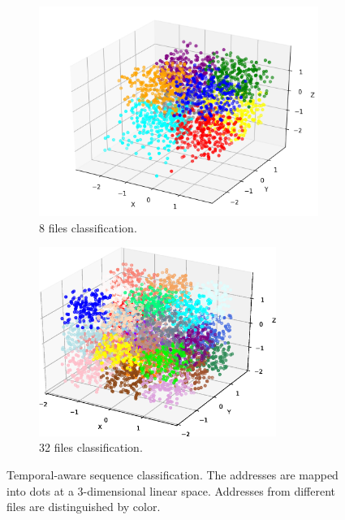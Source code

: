 \begin{figure}[t]
  \centering
  \begin{subfigure}[b]{0.45\textwidth}
    \includegraphics[width=\textwidth]{fig/fig_step_10_2000.png}
    \caption{8 files classification.}
    \label{fig:8files}
  \end{subfigure}
  \begin{subfigure}[b]{0.45\textwidth}
    \includegraphics[width=0.85\textwidth]{fig/fig_step_32_6_150.eps}
    \caption{32 files classification.}
    \label{fig:32files}
  \end{subfigure}
  \caption{Temporal-aware sequence classification. The addresses are mapped into dots at a 3-dimensional linear space. Addresses from different files are distinguished by color.}
  \label{fig:files}
\end{figure}

